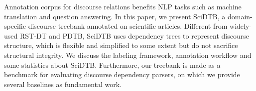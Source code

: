 Annotation corpus for discourse relations benefits NLP tasks such as machine translation and question answering. In this paper, we present SciDTB, a domain-specific discourse treebank annotated on scientific articles. Different from widely-used RST-DT and PDTB, SciDTB uses dependency trees to represent discourse structure, which is flexible and simplified to some extent but do not sacrifice structural integrity. We discuss the labeling framework, annotation workflow and some statistics about SciDTB. Furthermore, our treebank is made as a benchmark for evaluating discourse dependency parsers, on which we provide several baselines as fundamental work.
